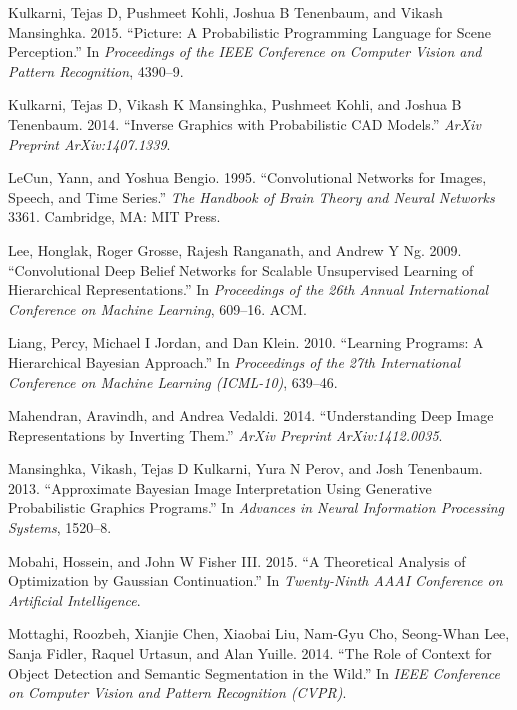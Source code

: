 \documentclass[12pt,twoside]{mitthesis}
\begin{document}
\hypertarget{ref-kulkarni2015picture}{}
Kulkarni, Tejas D, Pushmeet Kohli, Joshua B Tenenbaum, and Vikash
Mansinghka. 2015. ``Picture: A Probabilistic Programming Language for
Scene Perception.'' In \emph{Proceedings of the IEEE Conference on
Computer Vision and Pattern Recognition}, 4390--9.

\hypertarget{ref-kulkarni2014inverse}{}
Kulkarni, Tejas D, Vikash K Mansinghka, Pushmeet Kohli, and Joshua B
Tenenbaum. 2014. ``Inverse Graphics with Probabilistic CAD Models.''
\emph{ArXiv Preprint ArXiv:1407.1339}.

\hypertarget{ref-lecun1995convolutional}{}
LeCun, Yann, and Yoshua Bengio. 1995. ``Convolutional Networks for
Images, Speech, and Time Series.'' \emph{The Handbook of Brain Theory
and Neural Networks} 3361. Cambridge, MA: MIT Press.

\hypertarget{ref-lee2009convolutional}{}
Lee, Honglak, Roger Grosse, Rajesh Ranganath, and Andrew Y Ng. 2009.
``Convolutional Deep Belief Networks for Scalable Unsupervised Learning
of Hierarchical Representations.'' In \emph{Proceedings of the 26th
Annual International Conference on Machine Learning}, 609--16. ACM.

\hypertarget{ref-liang2010learning}{}
Liang, Percy, Michael I Jordan, and Dan Klein. 2010. ``Learning
Programs: A Hierarchical Bayesian Approach.'' In \emph{Proceedings of
the 27th International Conference on Machine Learning (ICML-10)},
639--46.

\hypertarget{ref-mahendran2014understanding}{}
Mahendran, Aravindh, and Andrea Vedaldi. 2014. ``Understanding Deep
Image Representations by Inverting Them.'' \emph{ArXiv Preprint
ArXiv:1412.0035}.

\hypertarget{ref-mansinghka2013approximate}{}
Mansinghka, Vikash, Tejas D Kulkarni, Yura N Perov, and Josh Tenenbaum.
2013. ``Approximate Bayesian Image Interpretation Using Generative
Probabilistic Graphics Programs.'' In \emph{Advances in Neural
Information Processing Systems}, 1520--8.

\hypertarget{ref-mobahi2015theoretical}{}
Mobahi, Hossein, and John W Fisher III. 2015. ``A Theoretical Analysis
of Optimization by Gaussian Continuation.'' In \emph{Twenty-Ninth AAAI
Conference on Artificial Intelligence}.

\hypertarget{ref-mottaghi2014role}{}
Mottaghi, Roozbeh, Xianjie Chen, Xiaobai Liu, Nam-Gyu Cho, Seong-Whan
Lee, Sanja Fidler, Raquel Urtasun, and Alan Yuille. 2014. ``The Role of
Context for Object Detection and Semantic Segmentation in the Wild.'' In
\emph{IEEE Conference on Computer Vision and Pattern Recognition
(CVPR)}.
\end{document}
